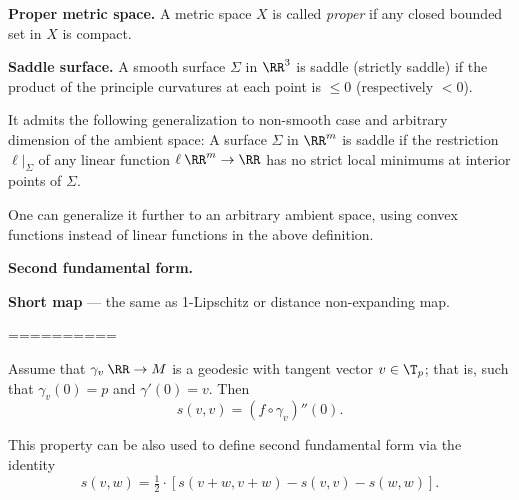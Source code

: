 \begin{description}
\item{\bf Proper metric space.}
\label{Proper metric space} 
A metric space $X$ is called \emph{proper} if any closed bounded set in $X$ is compact.




\item{\bf Saddle surface.}\label{Saddle surface} A smooth surface $\Sigma$ in $\RR^3$ is saddle 
(strictly saddle) 
if the product of the principle curvatures at each point is $\le 0$ (respectively $<0$).

It admits the following generalization to non-smooth case and arbitrary dimension of the ambient space:
A surface $\Sigma$ in $\RR^m$ is saddle if the restriction $\ell|_\Sigma$ of any linear function $\ell\:\RR^m\to\RR$ has no strict local minimums at interior points of $\Sigma$.

One can generalize it further to an arbitrary ambient space, using convex functions instead of linear functions in the above definition.




\item{\bf Second fundamental form.}\label{Second fundamental form} 


\item{\bf Short map}\label{Short map} --- the same as 1-Lipschitz 
or distance non-expanding map.

==========

Assume that $\gamma_v\:\RR\to M$ is a geodesic with tangent vector $v\in \T_p$;
that is, such that $\gamma_v(0)=p$ and $\gamma'(0)=v$.
Then 
\[s(v,v)=(f\circ\gamma_v)''(0).\]

This property can be also used to define second fundamental form via the identity
$$s(v,w)=\tfrac 12\cdot[s(v+w,v+w)-s(v,v)-s(w,w)].$$


\end{description}
